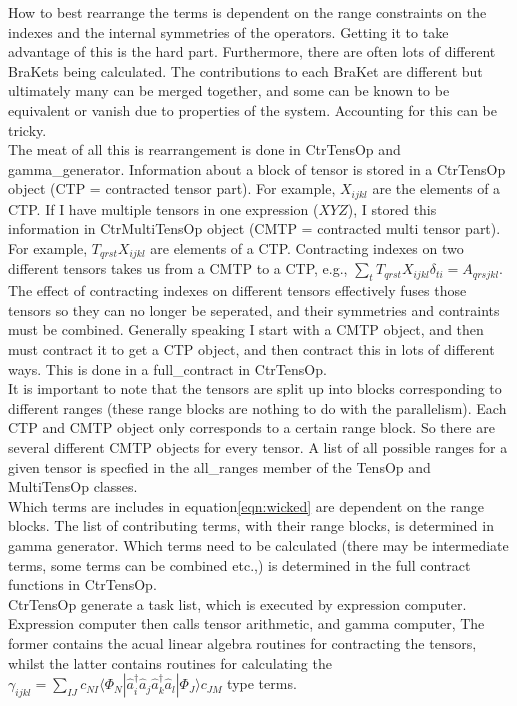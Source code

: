 \documentclass[12pt]{article}
\begin{document}
How to best rearrange the terms is dependent on the range constraints on the
indexes and the internal symmetries of the operators. Getting it to take 
advantage of this is the hard part. Furthermore, there  are often lots
of different BraKets being calculated. The contributions to each
BraKet are different but ultimately many can be merged together, and some 
can be known to be equivalent or vanish due to properties of the system. Accounting
for this can be tricky. \\

The meat of all this is rearrangement is done in CtrTensOp and
gamma\_generator.  Information about a block of tensor is stored in a CtrTensOp
object (CTP = contracted tensor part).  For example, $X_{ijkl}$ are the elements
of a CTP.  If I have multiple tensors in one expression ($XYZ$), I stored this
information in CtrMultiTensOp object (CMTP = contracted multi tensor part).
For example, $T_{qrst}X_{ijkl}$ are elements of a CTP.  Contracting indexes on
two different tensors takes us from a CMTP to a CTP, e.g.,
$\sum_{t}T_{qrst}X_{ijkl}\delta_{ti}=A_{qrsjkl} $.  The effect of contracting
indexes on different tensors effectively fuses those tensors so they can no
longer be seperated, and their symmetries and contraints must be combined.
Generally speaking I start with a CMTP object, and then must contract it to get
a CTP object, and then contract this in lots of different ways. This is done in
a full\_contract in CtrTensOp.  \\

It is important to note that the tensors are split up into blocks corresponding
to different ranges (these range blocks are nothing to do with the
parallelism). Each CTP and CMTP object only corresponds to a certain range
block. So there are several different CMTP objects for every tensor.  A list of
all possible ranges for a given tensor is specfied in the all\_ranges member of
the TensOp and MultiTensOp classes.\\

Which terms are includes in equation\ref{eqn:wicked} are dependent on the range
blocks. The list of contributing terms, with their range blocks, is determined
in gamma generator.  Which terms need to be calculated (there may be
intermediate terms, some terms can be combined etc.,) is determined in the full
contract functions in CtrTensOp. \\

CtrTensOp generate a task list, which is executed by expression computer.
Expression computer then calls tensor arithmetic,  and gamma computer, The
former contains the acual linear algebra routines for contracting the tensors,
whilst the latter contains routines for calculating 
the $\gamma_{ijkl} =\sum_{IJ} c_{NI}\langle \Phi_{N} |
\hat{a}_{i}^{\dagger}
\hat{a}_{j}
\hat{a}_{k}^{\dagger}
\hat{a}_{l}
| \Phi_{J} \rangle c_{JM}  $ type terms.
\end{document}
